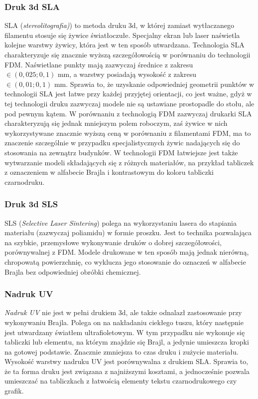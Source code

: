 \documentclass[12pt,a4paper]{article}
\begin{document}
\subsubsection{Druk 3d SLA}
SLA (\emph{stereolitografia)}) to metoda druku 3d, w której zamiast wytłaczanego filamentu stosuje się żywice światłoczułe. Specjalny ekran lub laser naświetla kolejne warstwy żywicy, która jest w ten sposób utwardzana.
Technologia SLA charakteryzuje się znacznie wyższą szczegółowością w porównaniu do technologii FDM. Naświetlane punkty mają zazwyczaj średnice z zakresu $\in (0{,}025; 0{,}1) \text{ mm}$, a warstwy posiadają wysokość z zakresu $\in (0{,}01; 0{,}1) \text{ mm}$.
Sprawia to, że uzyskanie odpowiedniej geometrii punktów w technologii SLA jest łatwe przy każdej przyjętej orientacji, co jest ważne, gdyż w tej technologii druku zazwyczaj modele nie są ustawiane prostopadle do stołu, ale pod pewnym kątem.
W porównaniu z technologią FDM zazwyczaj drukarki SLA charakteryzują się jednak mniejszym polem roboczym, zaś żywice w nich wykorzystywane znacznie wyższą ceną w porównaniu z filamentami FDM, ma to znaczenie szczególnie w przypadku specjalistycznych żywic nadających się do stosowania na zewnątrz budynków. W technologii FDM łatwiejsze jest także wytwarzanie modeli składających się z różnych materiałów, na przykład tabliczek z oznaczeniem w alfabecie Brajla i kontrastowym do koloru tabliczki czarnodruku.

\subsubsection{Druk 3d SLS}
SLS (\emph{Selective Laser Sintering}) polega na wykorzystaniu lasera do stapiania materiału (zazwyczaj poliamidu) w formie proszku. Jest to technika pozwalająca na szybkie, przemysłowe wykonywanie druków o dobrej szczegółowości, porównywalnej z FDM.
Modele drukowane w ten sposób mają jednak nierówną, chropowatą powierzchnię, co wyklucza jego stosowanie do oznaczeń w alfabecie Brajla bez odpowiedniej obróbki chemicznej.

\subsubsection{Nadruk UV}
\emph{Nadruk UV} nie jest w pełni drukiem 3d, ale także odnalazł zastosowanie przy wykonywaniu Brajla. Polega on na nakładaniu ciekłego tuszu, który następnie jest utwardzany  światłem ultrafioletowym. W tym przypadku nie wykonuje się tabliczki lub elementu, na którym znajdzie się Brajl, a jedynie umieszcza kropki na gotowej podstawie. Znacznie zmniejsza to czas druku i zużycie materiału.
Wysokość warstwy nadruku UV jest porównywalna z drukiem SLA. Sprawia to, że ta forma druku jest związana z najniższymi kosztami, a jednocześnie pozwala umieszczać na tabliczkach z łatwością elementy tekstu czarnodrukowego czy grafik.
\end{document}

